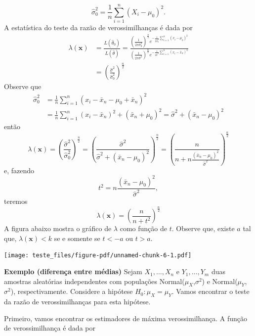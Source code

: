 \documentclass[
  letterpaper,
  DIV=11,
  numbers=noendperiod]{scrartcl}
\begin{document}
\[\hat{\sigma}^2_0=\frac{1}{n}\sum_{i=1}^n (X_i-\mu_0)^2.\] A
estatística do teste da razão de verossimilhanças é dada por
\[\begin{align}\lambda(\textbf{x})&=\frac{L(\hat{\theta}_0)}{L(\hat{\theta})}=\frac{\left(\frac{1}{2\pi\hat{\sigma}^2_0}\right)^{\frac{n}{2}} e^{-\frac{1}{2\hat{\sigma}^2_0}\sum_{i=1}^n(x_i-\mu_0)^2}}{\left(\frac{1}{2\pi\hat{\sigma}^2}\right)^{\frac{n}{2}} e^{-\frac{1}{2\hat{\sigma}^2}\sum_{i=1}^n(x_i-\bar{x}_n)^2}}\\&=\left(\frac{\hat{\sigma}^2}{\hat{\sigma}^2_0}\right)^{\frac{n}{2}}
\end{align}\] Observe que
\[\begin{align}\hat{\sigma}^2_0&=\frac{1}{n}\sum_{i=1}^n (x_i-\bar{x}_n-\mu_0+\bar{x}_n)^2\\&=\frac{1}{n}\sum_{i=1}^n (x_i-\bar{x}_n)^2 +(\bar{x}_n+\mu_0)^2=\hat{\sigma}^2+(\bar{x}_n-\mu_0)^2\end{align}\]
então
\[\lambda(\textbf{x})=\left(\frac{\hat{\sigma}^2}{\hat{\sigma}^2_0}\right)^{\frac{n}{2}}=\left(\frac{\hat{\sigma}^2}{\hat{\sigma}^2+(\bar{x}_n-\mu_0)^2}\right)^{\frac{n}{2}}=\left(\frac{n}{n+n\frac{(\bar{x}_n-\mu_0)^2}{\hat{\sigma}^2}}\right)^{\frac{n}{2}}\]
e, fazendo \[t^2=n\frac{(\bar{x}_n-\mu_0)^2}{\hat{\sigma}^2},\] teremos
\[\lambda(\textbf{x})=\left(\frac{n}{n+t^2}\right)^{\frac{n}{2}}\] A
figura abaixo mostra o gráfico de \(\lambda\) como função de \(t\).
Observe que, existe \(a\) tal que, \(\lambda(\textbf{x})<k\) se e
somente se \(t<-a\) ou \(t>a\).

\texttt{[image: teste\_files/figure-pdf/unnamed-chunk-6-1.pdf]}

\textbf{Exemplo (diferença entre médias)} Sejam \(X_1,\ldots,X_n\) e
\(Y_1,\ldots,Y_m\) duas amostras aleatórias independentes com populações
Normal(\(\mu_X\),\(\sigma^2\)) e Normal(\(\mu_Y\),\(\sigma^2\)),
respectivamente. Considere a hipótese \(H_0:\mu_X=\mu_Y\). Vamos
encontrar o teste da razão de verossimilhanças para esta hipótese.

Primeiro, vamos encontrar os estimadores de máxima verossimilhança. A
função de verossimilhança é dada por
\end{document}
